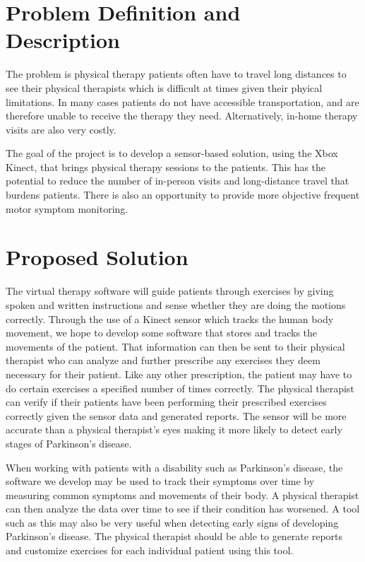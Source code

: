 \documentclass[onecolumn, draftclsnofoot,10pt, compsoc]{IEEEtran}
\begin{document}
\section{Problem Definition and Description}
    The problem is physical therapy patients often have to travel long distances to see their physical therapists which is difficult at times given their phyical limitations. In many cases patients do not have accessible transportation, and are therefore unable to receive the therapy they need. Alternatively, in-home therapy visits are also very costly.\par

The goal of the project is to develop a sensor-based solution, using the Xbox Kinect, that brings physical therapy sessions to the patients. This has the potential to reduce the number of in-person visits and long-distance travel that burdens patients. There is also an opportunity to provide more objective frequent motor symptom monitoring.\par

\section{Proposed Solution}
    The virtual therapy software will guide patients through exercises by giving spoken and written instructions and sense whether they are doing the motions correctly. Through the use of a Kinect sensor which tracks the human body movement, we hope to develop some software that stores and tracks the movements of the patient. That information can then be sent to their physical therapist who can analyze and further prescribe any exercises they deem necessary for their patient. Like any other prescription, the patient may have to do certain exercises a specified number of times correctly. The physical therapist can verify if their patients have been performing their prescribed exercises correctly given the sensor data and generated reports. The sensor will be more accurate than a physical therapist's eyes making it more likely to detect early stages of Parkinson's disease.\par

    When working with patients with a disability such as Parkinson's disease, the software we develop may be used to track their symptoms over time by measuring common symptoms and movements of their body. A physical therapist can then analyze the data over time to see if their condition has worsened. A tool such as this may also be very useful when detecting early signs of developing Parkinson's disease. The physical therapist should be able to generate reports and customize exercises for each individual patient using this tool. \par 
\end{document}
